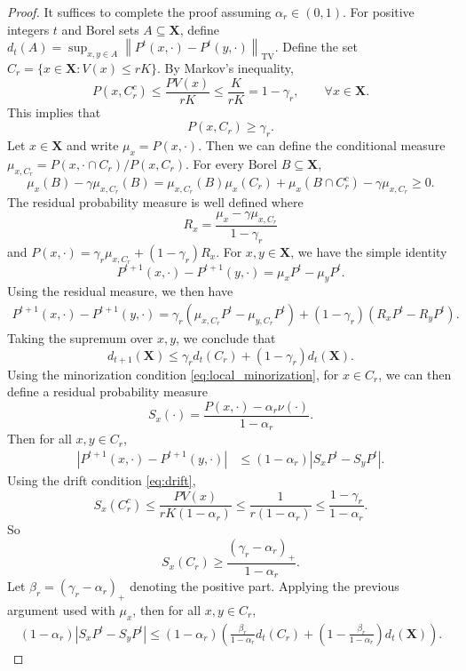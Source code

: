 \documentclass[ejsv2, noshowframe]{imsart}
\theoremstyle{plain}
\theoremstyle{definition}
\theoremstyle{remark}
\newcommand{\norm}[1]{\left\lVert#1\right\rVert}
\renewcommand{\P}{P}
\newcommand{\X}{\textbf{X}}
\begin{document}
\begin{proof}
It suffices to complete the proof assuming $\alpha_r \in (0, 1)$.
For positive integers $t$ and Borel sets $A \subseteq \X$, define $d_t(A) = \sup_{x, y \in A} \norm{\P^t(x, \cdot) - \P^t(y, \cdot)}_{\text{TV}}$.
Define the set $C_r = \{ x \in \X : V(x) \le  r K \}$. 
By Markov's inequality,
\[
P(x, C_r^c)
\le \frac{PV(x)}{r K}
\le \frac{K}{r K}
= 1- \gamma_r,
\qquad \forall x \in \X.
\]
This implies that 
\[
P(x, C_r) \ge \gamma_r.
\]
Let $x \in \X$ and write $\mu_x = \P(x, \cdot)$.
Then we can define the conditional measure $\mu_{x, C_r} = \P(x, \cdot \cap C_r) / \P(x, C_r)$.
For every Borel $B \subseteq \X$,
\[
\mu_x(B) - \gamma \mu_{x, C_r}(B)
= \mu_{x, C_r}(B) \mu_x(C_r) + \mu_x(B \cap C_r^c) - \gamma \mu_{x, C_r}
\ge 0.
\]
The residual probability measure is well defined where
\[
R_x = \frac{\mu_x - \gamma \mu_{x, C_r}}{1 - \gamma_r}
\]
and $\P(x, \cdot) = \gamma_r \mu_{x, C_r} + (1 - \gamma_r) R_x$.
For $x, y \in \X$, we have the simple identity
\[
\P^{t + 1}( x, \cdot ) - \P^{t + 1}( y, \cdot )
= \mu_{x} \P^{t} - \mu_{y} \P^{t}.
\]
Using the residual measure, we then have
\begin{align*}
\P^{t + 1}( x, \cdot ) - \P^{t + 1}( y, \cdot )
= \gamma_r ( \mu_{x, C_r} \P^{t} - \mu_{y, C_r} \P^{t} ) + ( 1 - \gamma_r ) ( R_x \P^{t} - R_y \P^{t} ).
\end{align*}
Taking the supremum over $x, y$, we conclude that
\[
d_{t + 1}(\X)
\le \gamma_r d_{t}(C_r) + ( 1 - \gamma_r ) d_{t}(\X).
\]
Using the minorization condition \eqref{eq:local_minorization}, for $x \in C_r$, we can then define a residual probability measure
\[
S_x(\cdot) = \frac{ \P(x, \cdot) - \alpha_r \nu(\cdot) }{ 1 - \alpha_r }.
\]
Then for all $x, y \in C_r$,
\begin{align*}
\left| \P^{t + 1}( x, \cdot ) - \P^{t + 1}( y, \cdot ) \right|
&\le ( 1 - \alpha_r ) \left| S_x \P^{t} - S_y \P^{t} \right|.
\end{align*}
Using the drift condition \eqref{eq:drift},
\[
S_x(C_r^c)
\le \frac{\P V(x)}{ r K  (1 - \alpha_r)}
\le \frac{1}{ r  (1 - \alpha_r)}
\le \frac{1 - \gamma_r}{1 - \alpha_r}.
\]
So 
\[
S_x(C_r)
\ge \frac{(\gamma_r - \alpha_r)_+}{1 - \alpha_r}.
\]
Let $\beta_r = (\gamma_r - \alpha_r)_+$ denoting the positive part.
Applying the previous argument used with $\mu_x$, then for all $x, y \in C_r$,
\begin{align*}
( 1 - \alpha_r ) \left| S_x \P^{t} - S_y \P^{t} \right|
\le ( 1 - \alpha_r ) \left( \frac{\beta_r}{1 - \alpha_r} d_{t}(C_r) + \left( 1 - \frac{\beta_r}{1 - \alpha_r} \right) d_{t}(\X) \right).

\end{align*}
\end{proof}
\end{document}
